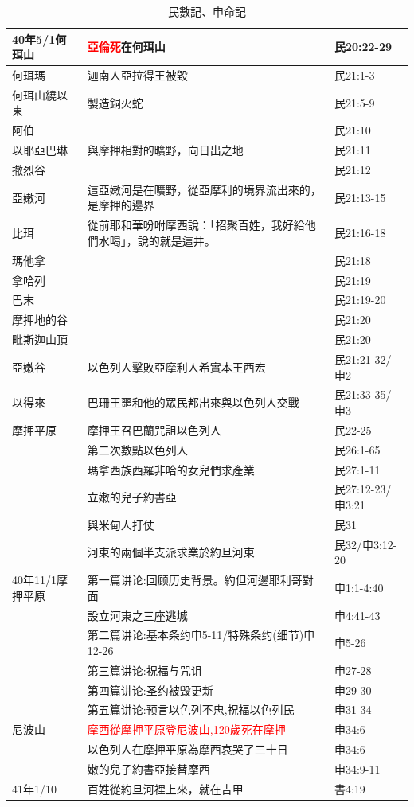 \begin{table}[H]
\begin{tabular}{p{3.2cm}|p{11cm}|p{3.2cm}}
40年5/1何珥山&\textcolor{red}{亞倫死}在何珥山&民20:22-29\\\hline
何珥瑪&迦南人亞拉得王被毀&民21:1-3\\\hline
何珥山繞以東&製造銅火蛇&民21:5-9\\\hline
阿伯&&民21:10\\\hline
以耶亞巴琳&與摩押相對的曠野，向日出之地&民21:11\\\hline
撒烈谷&&民21:12\\\hline
亞嫩河&這亞嫩河是在曠野，從亞摩利的境界流出來的，是摩押的邊界&民21:13-15\\\hline
比珥&從前耶和華吩咐摩西說：「招聚百姓，我好給他們水喝」，說的就是這井。&民21:16-18\\\hline
瑪他拿&&民21:18\\\hline
拿哈列&&民21:19\\\hline

巴末&&民21:19-20\\\hline
摩押地的谷&&民21:20\\\hline
毗斯迦山頂&&民21:20\\\hline
亞嫩谷&以色列人擊敗亞摩利人希實本王西宏&民21:21-32/申2\\\hline
以得來&巴珊王噩和他的眾民都出來與以色列人交戰&民21:33-35/申3\\\hline
摩押平原&摩押王召巴蘭咒詛以色列人&民22-25\\\hline
&第二次數點以色列人&民26:1-65\\\hline
&瑪拿西族西羅非哈的女兒們求產業&民27:1-11\\\hline
&立嫩的兒子約書亞&民27:12-23/申3:21\\\hline
&與米甸人打仗&民31\\\hline
&河東的兩個半支派求業於約旦河東&民32/申3:12-20\\\hline
40年11/1摩押平原&第一篇讲论:回顾历史背景。約但河邊耶利哥對面&申1:1-4:40\\\hline
&設立河東之三座逃城&申4:41-43\\\hline
&第二篇讲论:基本条约申5-11/特殊条约(细节)申12-26&申5-26\\\hline
&第三篇讲论:祝福与咒诅&申27-28\\\hline
&第四篇讲论:圣约被毁更新&申29-30\\\hline
&第五篇讲论:预言以色列不忠,祝福以色列民&申31-34\\\hline
尼波山&\textcolor{red}{摩西從摩押平原登尼波山,120歲死在摩押}&申34:6\\\hline
&以色列人在摩押平原為摩西哀哭了三十日&申34:6\\\hline
&嫩的兒子約書亞接替摩西&申34:9-11\\\hline
41年1/10&百姓從約旦河裡上來，就在吉甲&書4:19\\\hline
\end{tabular}
\caption{民數記、申命記}
\end{table}




